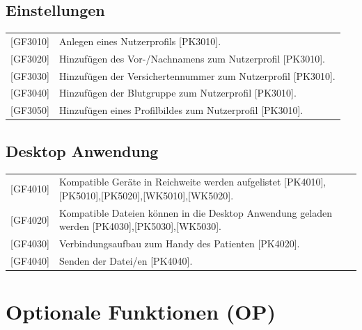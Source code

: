 \documentclass[a4paper]{scrreprt}
\begin{document}
\subsection{Einstellungen}
\begin{tabular}{lll}
[GF3010]&  \multicolumn{2}{p{12cm}}{Anlegen eines Nutzerprofils [PK3010].}\\
{[GF3020]} &  \multicolumn{2}{p{12cm}}{Hinzufügen des Vor-/Nachnamens zum Nutzerprofil [PK3010].}  \\
{[GF3030]} &  \multicolumn{2}{p{12cm}}{Hinzufügen der Versichertennummer zum Nutzerprofil [PK3010].}  \\
{[GF3040]} &  \multicolumn{2}{p{12cm}}{Hinzufügen der Blutgruppe zum Nutzerprofil [PK3010].}  \\
{[GF3050]} &  \multicolumn{2}{p{12cm}}{Hinzufügen eines Profilbildes zum Nutzerprofil [PK3010].}  \\
\end{tabular}

\subsection{\gls{Desktop Anwendung}}
\begin{tabular}{lll}
[GF4010]&  \multicolumn{2}{p{12cm}}{Kompatible Geräte in Reichweite werden aufgelistet [PK4010],[PK5010],[PK5020],[WK5010],[WK5020].}\\
{[GF4020]} &  \multicolumn{2}{p{12cm}}{Kompatible Dateien können in die Desktop Anwendung geladen werden [PK4030],[PK5030],[WK5030].}  \\
{[GF4030]} &  \multicolumn{2}{p{12cm}}{Verbindungsaufbau zum Handy des Patienten [PK4020].}  \\
{[GF4040]} &  \multicolumn{2}{p{12cm}}{Senden der Datei/en [PK4040].}  \\
\end{tabular}

\section{Optionale Funktionen (OP)}
\end{document}
